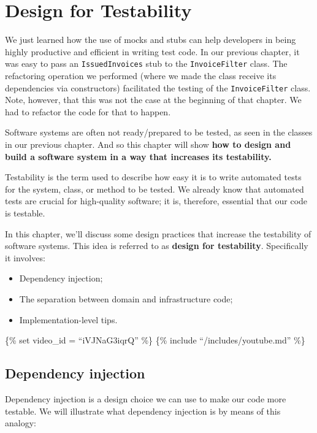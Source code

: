 \hypertarget{design-for-testability}{%
\section{Design for Testability}\label{design-for-testability}}

We just learned how the use of mocks and stubs can help developers in
being highly productive and efficient in writing test code. In our
previous chapter, it was easy to pass an \texttt{IssuedInvoices} stub to
the \texttt{InvoiceFilter} class. The refactoring operation we performed
(where we made the class receive its dependencies via constructors)
facilitated the testing of the \texttt{InvoiceFilter} class. Note,
however, that this was not the case at the beginning of that chapter. We
had to refactor the code for that to happen.

Software systems are often not ready/prepared to be tested, as seen in
the classes in our previous chapter. And so this chapter will show
\textbf{how to design and build a software system in a way that
increases its testability.}

Testability is the term used to describe how easy it is to write
automated tests for the system, class, or method to be tested. We
already know that automated tests are crucial for high-quality software;
it is, therefore, essential that our code is testable.

In this chapter, we'll discuss some design practices that increase the
testability of software systems. This idea is referred to as
\textbf{design for testability}. Specifically it involves:

\begin{itemize}
\tightlist
\item
  Dependency injection;
\item
  The separation between domain and infrastructure code;
\item
  Implementation-level tips.
\end{itemize}

\{\% set video\_id = ``iVJNaG3iqrQ'' \%\} \{\% include
``/includes/youtube.md'' \%\}

\hypertarget{dependency-injection}{%
\subsection{Dependency injection}\label{dependency-injection}}

Dependency injection is a design choice we can use to make our code more
testable. We will illustrate what dependency injection is by means of
this analogy:

